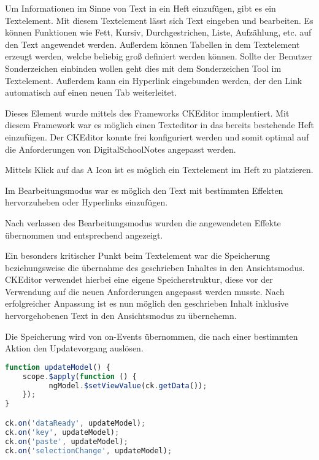 Um Informationen im Sinne von Text in ein Heft einzufügen, gibt es ein Textelement. Mit diesem Textelement lässt sich Text eingeben und bearbeiten. Es können Funktionen wie Fett, Kursiv, Durchgestrichen, Liste, Aufzählung, etc. auf den Text angewendet werden. Außerdem können Tabellen in dem Textelement erzeugt werden, welche beliebig groß definiert werden können. Sollte der Benutzer Sonderzeichen einbinden wollen geht dies mit dem Sonderzeichen Tool im Textelement. Außerdem kann ein Hyperlink eingebunden werden, der den Link automatisch auf einen neuen Tab weiterleitet.

Dieses Element wurde mittels des Frameworks CKEditor immplentiert. Mit diesem Framework war es möglich einen Texteditor in das bereits bestehende Heft einzufügen. Der CKEditor konnte frei konfiguriert werden und somit optimal auf die Anforderungen von DigitalSchoolNotes angepasst werden.

Mittels Klick auf das A Icon ist es möglich ein Textelement im Heft zu platzieren.

Im Bearbeitungsmodus war es möglich den Text mit bestimmten Effekten hervorzuheben oder Hyperlinks einzufügen.

Nach verlassen des Bearbeitungsmodus wurden die angewendeten Effekte übernommen und entsprechend angezeigt.

Ein besonders kritischer Punkt beim Textelement war die Speicherung beziehungsweise die übernahme des geschrieben Inhaltes in den Ansichtsmodus. CKEditor verwendet hierbei eine eigene Speicherstruktur, diese vor der Verwendung auf die neuen Anforderungen angepasst werden musste. Nach erfolgreicher Anpassung ist es nun möglich den geschrieben Inhalt inklusive hervorgehobenen Text in den Ansichtsmodus zu übernehemn.

Die Speicherung wird von on-Events übernommen, die nach einer bestimmten Aktion den Updatevorgang auslösen.
\begin{lstlisting}[caption={Speicherung des Textelements}, language=Javascript]
function updateModel() {
	scope.$apply(function () {
          ngModel.$setViewValue(ck.getData());
    });
}

ck.on('dataReady', updateModel);
ck.on('key', updateModel);
ck.on('paste', updateModel);
ck.on('selectionChange', updateModel);
\end{lstlisting}


